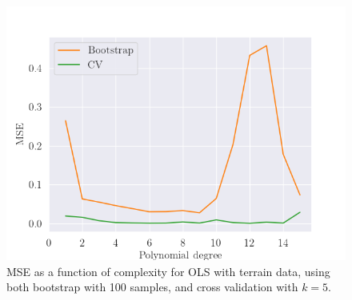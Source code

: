 \begin{figure}[H]
    \centering
    \includegraphics[width=\linewidth]{images/bootstrap_cv_terrain.png}
    \caption{MSE as a function of complexity for OLS with terrain data, using both bootstrap with 100 samples, and cross validation with $k=5$.}
    \label{fig:bootstrap_cv_terrain}
\end{figure}

